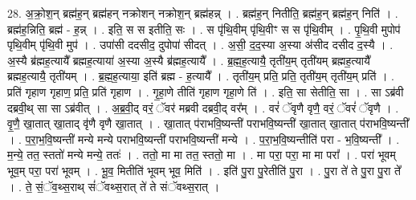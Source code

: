 \documentclass[17pt]{extarticle}
\begin{document}
28. अ॒क्रो॒श॒न् ब्रह्म॑ह॒न् ब्रह्म॑हन् नक्रोशन् नक्रोश॒न् ब्रह्म॑हन्न् । . ब्रह्म॑ह॒न् नितीति॒ ब्रह्म॑ह॒न् ब्रह्म॑ह॒न् निति॑ । . ब्रह्म॑ह॒न्निति॒ ब्रह्म॑ - ह॒न्न् । . इति॒ स स इतीति॒ सः । . स पृ॑थि॒वीम् पृ॑थि॒वीꣳ स स पृ॑थि॒वीम् । . पृ॒थि॒वी मुपोप॑ पृथि॒वीम् पृ॑थि॒वी मुप॑ । . उपा॑सी ददसीद॒ दुपोपा॑ सीदत् । . अ॒सी॒ द॒द॒स्या अ॒स्या अ॑सीद दसीद द॒स्यै । . अ॒स्यै ब्र॑ह्मह॒त्यायै᳚ ब्रह्मह॒त्याया॑ अ॒स्या अ॒स्यै ब्र॑ह्मह॒त्यायै᳚ । . ब्र॒ह्म॒ह॒त्यायै॒ तृती॑य॒म् तृती॑यम् ब्रह्मह॒त्यायै᳚ ब्रह्मह॒त्यायै॒ तृती॑यम् । . ब्र॒ह्म॒ह॒त्याया॒ इति॑ ब्रह्म - ह॒त्यायै᳚ । . तृती॑य॒म् प्रति॒ प्रति॒ तृती॑य॒म् तृती॑य॒म् प्रति॑ । . प्रति॑ गृहाण गृहाण॒ प्रति॒ प्रति॑ गृहाण । . गृ॒हा॒णे तीति॑ गृहाण गृहा॒णे ति॑ । . इति॒ सा सेतीति॒ सा । . सा ऽब्र॑वी दब्रवी॒थ् सा सा ऽब्र॑वीत् । . अ॒ब्र॒वी॒द् वरं॒ ॅवर॑ मब्रवी दब्रवी॒द् वर᳚म् । . वरं॑ ॅवृणै वृणै॒ वरं॒ ॅवरं॑ ॅवृणै । . वृ॒णै॒ खा॒तात् खा॒ताद् वृ॑णै वृणै खा॒तात् । . खा॒तात् प॑राभवि॒ष्यन्ती॑ पराभवि॒ष्यन्ती॑ खा॒तात् खा॒तात् प॑राभवि॒ष्यन्ती᳚ । . प॒रा॒भ॒वि॒ष्यन्ती॑ मन्ये मन्ये पराभवि॒ष्यन्ती॑ पराभवि॒ष्यन्ती॑ मन्ये । . प॒रा॒भ॒वि॒ष्यन्तीति॑ परा - भ॒वि॒ष्यन्ती᳚ । . म॒न्ये॒ तत॒ स्ततो॑ मन्ये मन्ये॒ ततः॑ । . ततो॒ मा मा तत॒ स्ततो॒ मा । . मा परा॒ परा॒ मा मा परा᳚ । . परा॑ भूवम् भूव॒म् परा॒ परा॑ भूवम् । . भू॒व॒ मितीति॑ भूवम् भूव॒ मिति॑ । . इति॑ पु॒रा पु॒रेतीति॑ पु॒रा । . पु॒रा ते॑ ते पु॒रा पु॒रा ते᳚ । . ते॒ सं॒ॅव॒थ्स॒राथ् सं॑ॅवथ्स॒रात् ते॑ ते संॅवथ्स॒रात् । \newline
\end{document}

